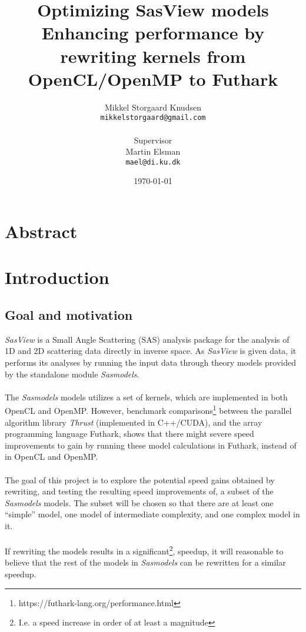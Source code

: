 \documentclass[11pt]{article}
\title{
  \vspace{3cm}
  \Huge{Optimizing SasView models} \\
  \Large{Enhancing performance by rewriting kernels from OpenCL/OpenMP to Futhark}
}
\author{
  \Large{Mikkel Storgaard Knudsen}
  \\ \texttt{mikkelstorgaard@gmail.com} \\
  \\
  \Large{Supervisor}
  \\ Martin Elsman
  \\ \texttt{mael@di.ku.dk} \\
}
\date{
    \today
}
\def \ColourPDF {include/ku-farve}
\def \TitlePDF   {include/ku-en}  %
\begin{document}


\clearpage\maketitle
\thispagestyle{empty}

\section*{Abstract}

\newpage

\section{Introduction}
\subsection{Goal and motivation}
\textit{SasView} is a Small Angle Scattering (SAS) analysis package for the analysis of
1D and 2D scattering data directly in inverse space.
As \textit{SasView} is given data, it performs its analyses by running the input data
through theory models provided by the standalone module \textit{Sasmodels}.
\\
\\
The \textit{Sasmodels} models utilizes a set of kernels, which are implemented
in both OpenCL and OpenMP.
However, benchmark
comparisons\footnote{https://futhark-lang.org/performance.html} between the
parallel algorithm library \textit{Thrust} (implemented in C++/CUDA), and the
array programming language Futhark, shows that there might severe speed
improvements to gain by running these model calculations in Futhark, instead
of in OpenCL and OpenMP.
\\
\\
The goal of this project is to explore the potential speed gains obtained by
rewriting, and testing the resulting speed improvements of, a subset of the
\textit{Sasmodels} models.
The subset will be chosen so that there are at least
one ``simple'' model, one model of intermediate complexity, and one complex
model in it.
\\
\\
If rewriting the models results in a significant\footnote{I.e. a speed increase
  in order of at least a magnitude}, speedup, it will reasonable to believe that 
  the rest of the models in \textit{Sasmodels} can be rewritten for a similar
  speedup.
\end{document}
